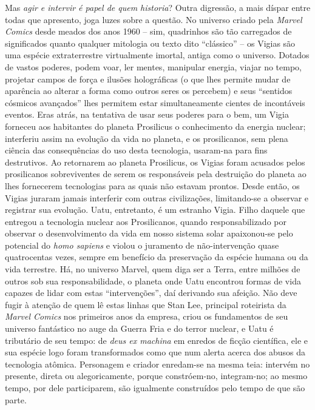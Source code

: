 Mas \textit{agir e intervir é papel de quem historia}? Outra digressão, a mais díspar entre todas que apresento, joga luzes sobre a questão. No universo criado pela \textit{Marvel Comics} desde meados dos anos 1960 -- sim, quadrinhos são tão carregados de significados quanto qualquer mitologia ou texto dito ``clássico'' -- os Vigias são uma espécie extraterrestre virtualmente imortal, antiga como o universo. Dotados de vastos poderes, podem voar, ler mentes, manipular energia, viajar no tempo, projetar campos de força e ilusões holográficas (o que lhes permite mudar de aparência ao alterar a forma como outros seres os percebem) e seus ``sentidos cósmicos avançados'' lhes permitem estar simultaneamente cientes de incontáveis eventos. Eras atrás, na tentativa de usar seus poderes para o bem, um Vigia forneceu aos habitantes do planeta Prosilicus o conhecimento da energia nuclear; interferiu assim na evolução da vida no planeta, e os prosilicanos, sem plena ciência das consequências do uso desta tecnologia, usaram-na para fins destrutivos. Ao retornarem ao planeta Prosilicus, os Vigias foram acusados pelos prosilicanos sobreviventes de serem os responsáveis pela destruição do planeta ao lhes fornecerem tecnologias para as quais não estavam prontos. Desde então, os Vigias juraram jamais interferir com outras civilizações, limitando-se a observar e registrar sua evolução. Uatu, entretanto, é um estranho Vigia. Filho daquele que entregou a tecnologia nuclear aos Prosilicanos, quando responsabilizado por observar o desenvolvimento da vida em nosso sistema solar apaixonou-se pelo potencial do \textit{homo sapiens} e violou o juramento de não-intervenção quase quatrocentas vezes, sempre em benefício da preservação da espécie humana ou da vida terrestre. Há, no universo Marvel, quem diga ser a Terra, entre milhões de outros sob sua responsabilidade, o planeta onde Uatu encontrou formas de vida capazes de lidar com estas ``intervenções'', daí derivando sua afeição. Não deve fugir à atenção de quem lê estas linhas que Stan Lee, principal roteirista da \textit{Marvel Comics} nos primeiros anos da empresa, criou os fundamentos de seu universo fantástico no auge da Guerra Fria e do terror nuclear, e Uatu é tributário de seu tempo: de \textit{deus ex machina} em enredos de ficção científica, ele e sua espécie logo foram transformados como que num alerta acerca dos abusos da tecnologia atômica. Personagem e criador enredam-se na mesma teia: intervém no presente, direta ou alegoricamente, porque constróem-no, integram-no; ao mesmo tempo, por dele participarem, são igualmente construídos pelo tempo de que são parte. 

